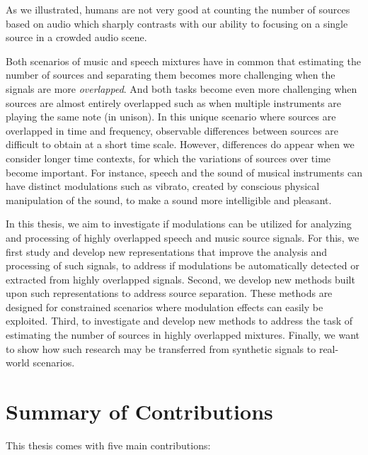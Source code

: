 As we illustrated, humans are not very good at counting the number of sources based on audio which sharply contrasts with our ability to focusing on a single source in a crowded audio scene.
\par
Both scenarios of music and speech mixtures have in common that estimating the number of sources and separating them becomes more challenging when the signals are more \emph{overlapped}.
And both tasks become even more challenging when sources are almost entirely overlapped such as when multiple instruments are playing the same note (in unison).
In this unique scenario where sources are overlapped in time and frequency,
observable differences between sources are difficult to obtain at a short time scale.
However, differences do appear when we consider longer time contexts, for which the variations of sources over time become important.
For instance, speech and the sound of musical instruments can have distinct modulations such as vibrato, created by conscious physical manipulation of the sound, to make a sound more intelligible and pleasant.
\par
In this thesis, we aim to investigate if modulations can be utilized for analyzing and processing of highly overlapped speech and music source signals.
For this, we first study and develop new representations that improve the analysis and processing of such signals, to address if modulations be automatically detected or extracted from highly overlapped signals.
Second, we develop new methods built upon such representations to address source separation. 
These methods are designed for constrained scenarios where modulation effects can easily be exploited.
Third, to investigate and develop new methods to address the task of estimating the number of sources in highly overlapped mixtures.
Finally, we want to show how such research may be transferred from synthetic signals to real-world scenarios.

\section{Summary of Contributions}

This thesis comes with five main contributions:


